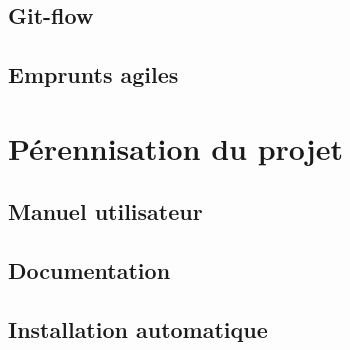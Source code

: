 		\subsection{Git-flow}
		
			\lipsum[6-9]
			
		\subsection{Emprunts agiles}
		
			\lipsum[6-9]
			

	\section{Pérennisation du projet}
	
		\subsection{Manuel utilisateur}
		
			\lipsum[6-9]
			
		\subsection{Documentation}
		
			\lipsum[6-9]
			
		\subsection{Installation automatique}
		
			\lipsum[6-9]
				
